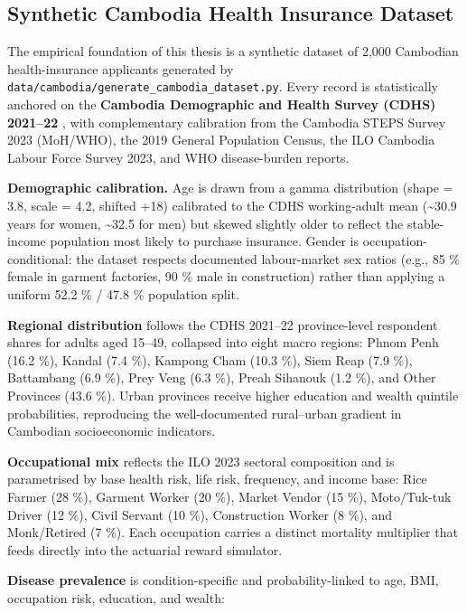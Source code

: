 \subsection{Synthetic Cambodia Health Insurance Dataset}\label{synthetic-cambodia-health-insurance-dataset}

The empirical foundation of this thesis is a synthetic dataset of 2,000 Cambodian health-insurance applicants generated by \texttt{data/cambodia/generate\_cambodia\_dataset.py}. Every record is statistically anchored on the \textbf{Cambodia Demographic and Health Survey (CDHS) 2021--22} \citep{NIS2023}, with complementary calibration from the Cambodia STEPS Survey 2023 (MoH/WHO), the 2019 General Population Census, the ILO Cambodia Labour Force Survey 2023, and WHO disease-burden reports.

\textbf{Demographic calibration.} Age is drawn from a gamma distribution (shape = 3.8, scale = 4.2, shifted +18) calibrated to the CDHS working-adult mean (\textasciitilde30.9 years for women, \textasciitilde32.5 for men) but skewed slightly older to reflect the stable-income population most likely to purchase insurance. Gender is occupation-conditional: the dataset respects documented labour-market sex ratios (e.g., 85 \% female in garment factories, 90 \% male in construction) rather than applying a uniform 52.2 \% / 47.8 \% population split.

\textbf{Regional distribution} follows the CDHS 2021--22 province-level respondent shares for adults aged 15--49, collapsed into eight macro regions: Phnom Penh (16.2 \%), Kandal (7.4 \%), Kampong Cham (10.3 \%), Siem Reap (7.9 \%), Battambang (6.9 \%), Prey Veng (6.3 \%), Preah Sihanouk (1.2 \%), and Other Provinces (43.6 \%). Urban provinces receive higher education and wealth quintile probabilities, reproducing the well-documented rural--urban gradient in Cambodian socioeconomic indicators.

\textbf{Occupational mix} reflects the ILO 2023 sectoral composition and is parametrised by base health risk, life risk, frequency, and income base: Rice Farmer (28 \%), Garment Worker (20 \%), Market Vendor (15 \%), Moto/Tuk-tuk Driver (12 \%), Civil Servant (10 \%), Construction Worker (8 \%), and Monk/Retired (7 \%). Each occupation carries a distinct mortality multiplier that feeds directly into the actuarial reward simulator.

\textbf{Disease prevalence} is condition-specific and probability-linked to age, BMI, occupation risk, education, and wealth:

